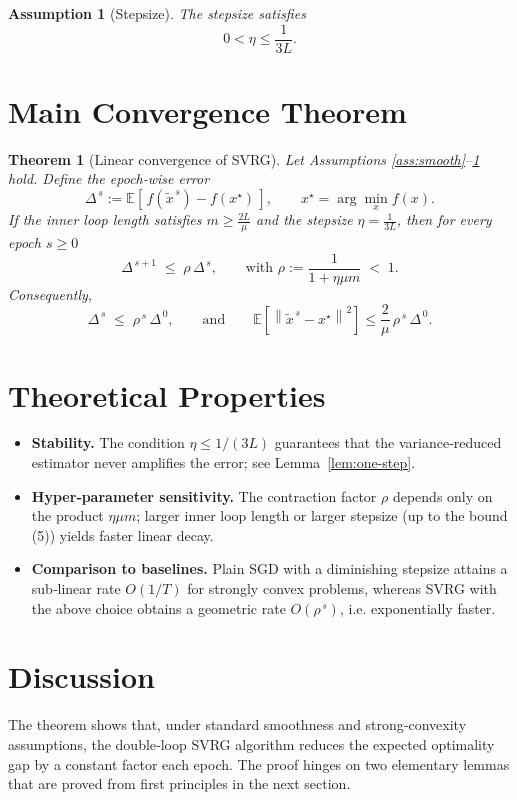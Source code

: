 \documentclass{article}
\newtheorem{theorem}{Theorem}
\newtheorem{assumption}{Assumption}
\newcommand{\E}{\mathbb{E}}
\newcommand{\norm}[1]{\left\|#1\right\|}
\begin{document}
\begin{assumption}[Stepsize]\label{ass:stepsize}
The stepsize satisfies
\[
0<\eta\le \frac{1}{3L}.
\tag{5}
\]
\end{assumption}

\section*{Main Convergence Theorem}
\begin{theorem}[Linear convergence of SVRG]\label{thm:linear}
Let Assumptions \ref{ass:smooth}–\ref{ass:stepsize} hold.
Define the epoch‑wise error
\[
\Delta^{\,s}:= \E\!\left[\,f(\tilde{x}^{\,s})-f(x^{\star})\,\right],
\qquad x^{\star}= \arg\min_x f(x).
\]
If the inner loop length satisfies \(m\ge \frac{2L}{\mu}\) and the stepsize
\(\eta = \frac{1}{3L}\), then for every epoch \(s\ge0\)
\[
\Delta^{\,s+1}\;\le\;\rho\,\Delta^{\,s},
\qquad\text{with }\rho:=\frac{1}{1+\eta\mu m}\;<\;1.
\tag{6}
\]
Consequently,
\[
\Delta^{\,s}\;\le\;\rho^{\,s}\,\Delta^{\,0},
\qquad\text{and}\qquad
\E\!\left[\norm{\tilde{x}^{\,s}-x^{\star}}^{2}\right]
\le\frac{2}{\mu}\,\rho^{\,s}\,\Delta^{\,0}.
\tag{7}
\]
\end{theorem}

\section*{Theoretical Properties}
\begin{itemize}[leftmargin=*]
\item \textbf{Stability.} The condition \(\eta\le 1/(3L)\) guarantees that the
variance‑reduced estimator never amplifies the error; see Lemma~\ref{lem:one-step}.
\item \textbf{Hyper‑parameter sensitivity.}
The contraction factor \(\rho\) depends only on the product \(\eta\mu m\);
larger inner loop length or larger stepsize (up to the bound (5)) yields faster
linear decay.
\item \textbf{Comparison to baselines.}
Plain SGD with a diminishing stepsize attains a sub‑linear rate
\(O(1/T)\) for strongly convex problems, whereas SVRG with the above
choice obtains a geometric rate \(O(\rho^{\,s})\), i.e. exponentially faster.
\end{itemize}

\section*{Discussion}
The theorem shows that, under standard smoothness and strong‑convexity
assumptions, the double‑loop SVRG algorithm reduces the expected optimality
gap by a constant factor each epoch. The proof hinges on two elementary
lemmas that are proved from first principles in the next section.
\end{document}
